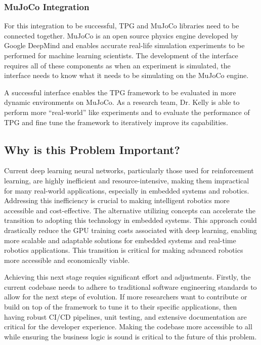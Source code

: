 \documentclass{article}
\begin{document}
\subsubsection{MuJoCo Integration}

For this integration to be successful, TPG and MuJoCo libraries need to be connected together. MuJoCo is an open source physics engine developed by Google DeepMind and enables accurate real-life simulation experiments to be performed for machine learning scientists. The development of the interface requires all of these components as when an experiment is simulated, the interface needs to know what it needs to be simulating on the MuJoCo engine. 

A successful interface enables the TPG framework to be evaluated in more dynamic environments on MuJoCo. As a research team, Dr. Kelly is able to perform more “real-world” like experiments and to evaluate the performance of TPG and fine tune the framework to iteratively improve its capabilities.

\subsection{Why is this Problem Important?}
Current deep learning neural networks, particularly those used for reinforcement learning, are highly inefficient and resource-intensive, making them impractical for many real-world applications, especially in embedded systems and robotics. Addressing this inefficiency is crucial to making intelligent robotics more accessible and cost-effective.  The alternative utilizing concepts  can accelerate the transition to adopting this technology in embedded systems. This approach could drastically reduce the GPU training costs associated with deep learning, enabling more scalable and adaptable solutions for embedded systems and real-time robotics applications. This transition is critical for making advanced robotics more accessible and economically viable.

Achieving this next stage requies significant effort and adjustments. Firstly, the current codebase needs to adhere to traditional software engineering standards to allow for the next steps of evolution. If more researchers want to contribute or build on top of the framework to tune it to their specific applications, then having robust CI/CD pipelines, unit testing, and extensive documentation are critical for the developer experience. Making the codebase more accessible to all while ensuring the business logic is sound is critical to the future of this problem. 
\end{document}
